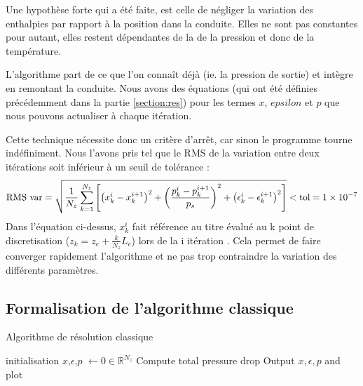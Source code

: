 Une hypothèse forte qui a été faite, est celle de négliger la variation des enthalpies par rapport à la position dans la conduite. Elles ne sont pas constantes pour autant, elles restent dépendantes de la de la pression et donc de la température.\\ \par
L'algorithme part de ce que l'on connaît déjà (ie. la pression de sortie) et intègre en \og remontant \fg{} la conduite. Nous avons des équations (qui ont été définies précédemment dans la partie \ref{section:res}) pour les termes $x$, $epsilon$ et $p$ que nous pouvons actualiser à chaque itération.\\ \par
Cette technique nécessite donc un critère d'arrêt, car sinon le programme tourne indéfiniment. Nous l'avons pris tel que le RMS de la variation entre deux itérations soit inférieur à un seuil de tolérance :
\begin{equation}
    \textnormal{RMS var} = \sqrt{\frac{1}{N_z}\sum_{k=1}^{N_z}\left[\left(x^{i}_k-x^{i+1}_k\right)^2 + \left(\frac{p^i_k- p^{i+1}_k}{p_s} \right)^2 + \left(\epsilon^i_k - \epsilon^{i+1}_k \right)^2\right]} <  \textnormal{tol} =\num{1e-7}
\end{equation}
Dans l'équation ci-dessus, $x^i_k$ fait référence au titre évalué au k point de discretisation ($z_k = z_e + \frac{k}{N_z}L_c$) lors de la i itération . Cela permet de faire converger rapidement l'algorithme et ne pas trop contraindre la variation des différents paramètres.


\subsection{Formalisation de l'algorithme classique}

\begin{algorithm}
\caption{Algorithme de résolution classique}
\SetAlgoLined
{}
initialisation\;
$x$,$\epsilon$,$p$ $\leftarrow 0 \in \mathbb{R}^{N_z}$ \;
Compute total pressure drop\;
Output $x,\epsilon,p$ and plot\;
\end{algorithm}
